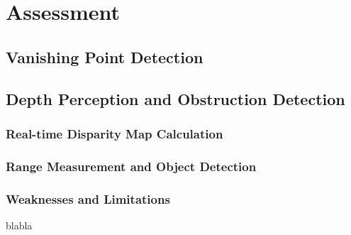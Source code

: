 \chapter{Assessment}

\section{Vanishing Point Detection}



\section{Depth Perception and Obstruction Detection}

\subsection{Real-time Disparity Map Calculation}

\subsection{Range Measurement and Object Detection}

\subsection{Weaknesses and Limitations}

blabla
